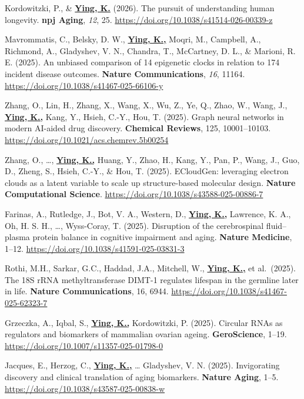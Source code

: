 \documentclass[
  11pt,
]
{article}
\begin{document}
Kordowitzki, P., \& \textbf{\underline{Ying, K.}} (2026). The pursuit of
understanding human longevity. \textbf{npj Aging}, \emph{12}, 25.
\url{https://doi.org/10.1038/s41514-026-00339-z}

Mavrommatis, C., Belsky, D. W., \textbf{\underline{Ying, K.,}} Moqri,
M., Campbell, A., Richmond, A., Gladyshev, V. N., Chandra, T.,
McCartney, D. L., \& Marioni, R. E. (2025). An unbiased comparison of 14
epigenetic clocks in relation to 174 incident disease outcomes.
\textbf{Nature Communications}, \emph{16}, 11164.
\url{https://doi.org/10.1038/s41467-025-66106-y}

Zhang, O., Lin, H., Zhang, X., Wang, X., Wu, Z., Ye, Q., Zhao, W., Wang,
J., \textbf{\underline{Ying, K.,}} Kang, Y., Hsieh, C.-Y., Hou, T.
(2025). Graph neural networks in modern AI-aided drug discovery.
\textbf{Chemical Reviews}, 125, 10001--10103.
\url{https://doi.org/10.1021/acs.chemrev.5b00254}

Zhang, O., \ldots, \textbf{\underline{Ying, K.,}} Huang, Y., Zhao, H.,
Kang, Y., Pan, P., Wang, J., Guo, D., Zheng, S., Hsieh, C.-Y., \& Hou,
T. (2025). ECloudGen: leveraging electron clouds as a latent variable to
scale up structure-based molecular design. \textbf{Nature Computational
Science}. \url{https://doi.org/10.1038/s43588-025-00886-7}

Farinas, A., Rutledge, J., Bot, V. A., Western, D.,
\textbf{\underline{Ying, K.,}} Lawrence, K. A., Oh, H. S. H., \ldots,
Wyss-Coray, T. (2025). Disruption of the cerebrospinal fluid--plasma
protein balance in cognitive impairment and aging. \textbf{Nature
Medicine}, 1--12. \url{https://doi.org/10.1038/s41591-025-03831-3}

Rothi, M.H., Sarkar, G.C., Haddad, J.A., Mitchell, W.,
\textbf{\underline{Ying, K.,}} et al.~(2025). The 18S rRNA
methyltransferase DIMT-1 regulates lifespan in the germline later in
life. \textbf{Nature Communications}, 16, 6944.
\url{https://doi.org/10.1038/s41467-025-62323-7}

Grzeczka, A., Iqbal, S., \textbf{\underline{Ying, K.,}} Kordowitzki, P.
(2025). Circular RNAs as regulators and biomarkers of mammalian ovarian
ageing. \textbf{GeroScience}, 1--19.
\url{https://doi.org/10.1007/s11357-025-01798-0}

Jacques, E., Herzog, C., \textbf{\underline{Ying, K.,}} \ldots{}
Gladyshev, V. N. (2025). Invigorating discovery and clinical translation
of aging biomarkers. \textbf{Nature Aging}, 1--5.
\url{https://doi.org/10.1038/s43587-025-00838-w}
\end{document}
